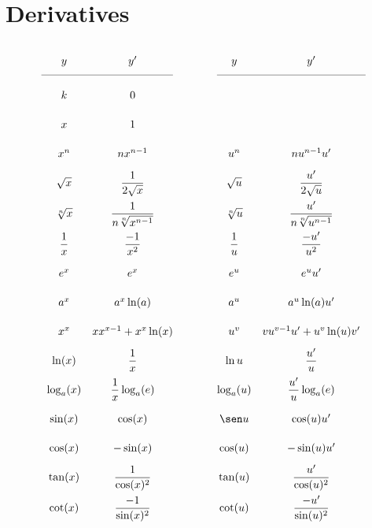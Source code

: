 \section*{Derivatives}
\small
{}

\centering
\begin{tcolorbox}[hbox, title=Basic derivatives]
\begin{minipage}{0.7\textwidth}
\[
  \def\arraystretch{2.2}
  \begin{array}{ccccc}
  y            & y'                            & \qquad & y            & y'\\
  \cmidrule(r){1-2}\cmidrule(l){4-5}
  k            & 0\\
  x            & 1\\ 
  x^n          & nx^{n-1}                      & \qquad & u^n          & nu^{n-1}u'\\
  \sqrt{x}     & \dfrac{1}{2\sqrt{x}}          & \qquad & \sqrt{u}     & \dfrac{u'}{2\sqrt{u}}\\
  \sqrt[n]{x}  & \dfrac{1}{n\sqrt[n]{x^{n-1}}} & \qquad & \sqrt[n]{u}  & \dfrac{u'}{n\sqrt[n]{u^{n-1}}}\\
  \dfrac{1}{x} & \dfrac{-1}{x^2}               & \qquad & \dfrac{1}{u} & \dfrac{-u'}{u^2}\\  
  e^x          & e^x                           & \qquad & e^u          & e^u u'\\
  a^x          & a^x\ln(a)                     & \qquad & a^u          & a^u\ln(a)u'\\
  x^x          & xx^{x-1}+x^x\ln(x)            & \qquad & u^v          & vu^{v-1}u'+u^v\ln(u) v'\\
  \ln(x)       & \dfrac{1}{x}                  & \qquad & \ln u        & \dfrac{u'}{u}\\
  \log_a(x)    & \dfrac{1}{x}\log_a(e)         & \qquad & \log_a(u)    & \dfrac{u'}{u}\log_a(e)\\
  \sin(x)      & \cos(x)                       & \qquad & \sen u       & \cos(u)u'\\
  \cos(x)      & -\sin(x)                      & \qquad & \cos(u)      & -\sin(u)u'\\
  \tan(x)      & \dfrac{1}{\cos(x)^2}          & \qquad & \tan(u)      & \dfrac{u'}{\cos(u)^2}\\
  \cot(x)      & \dfrac{-1}{\sin(x)^2}         & \qquad & \cot(u)      & \dfrac{-u'}{\sin(u)^2}\\

\end{array}\]
\end{minipage}
\end{tcolorbox}
